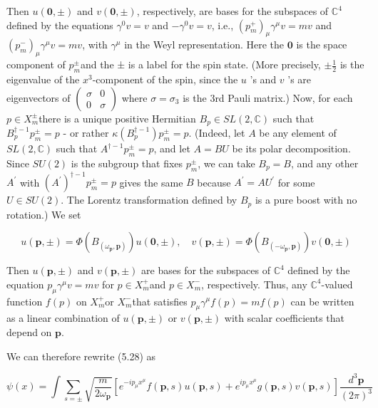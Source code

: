 \documentclass[10pt, letterpaper]{article}
\begin{document}
Then $u(\mathbf{0}, \pm)$ and $v(\mathbf{0}, \pm)$, respectively, are bases for the subspaces of $\mathbb{C}^{4}$ defined by the equations $\gamma^{0} v=v$ and $-\gamma^{0} v=v$, i.e., $\left(p_{m}^{+}\right)_{\mu} \gamma^{\mu} v=m v$ and $\left(p_{m}^{-}\right)_{\mu} \gamma^{\mu} v=m v$, with $\gamma^{\mu}$ in the Weyl representation. Here the $\mathbf{0}$ is the space component of $p_{m}^{ \pm}$and the ± is a label for the spin state. (More precisely, $\pm \frac{1}{2}$ is the eigenvalue of the $x^{3}$-component of the spin, since the $u$ 's and $v$ 's are eigenvectors of $\left(\begin{array}{cc}\sigma & 0 \\ 0 & \sigma\end{array}\right)$ where $\sigma=\sigma_{3}$ is the 3rd Pauli matrix.) Now, for each $p \in X_{m}^{ \pm}$there is a unique positive Hermitian $B_{p} \in S L(2, \mathbb{C})$ such that $B_{p}^{\dagger-1} p_{m}^{ \pm}=p$ - or rather $\kappa\left(B_{p}^{\dagger-1}\right) p_{m}^{ \pm}=p$. (Indeed, let $A$ be any element of $S L(2, \mathbb{C})$ such that $A^{\dagger-1} p_{m}^{ \pm}=p$, and let $A=B U$ be its polar decomposition. Since $S U(2)$ is the subgroup that fixes $p_{m}^{ \pm}$, we can take $B_{p}=B$, and any other $A^{\prime}$ with $\left(A^{\prime}\right)^{\dagger-1} p_{m}^{ \pm}=p$ gives the same $B$ because $A^{\prime}=A U^{\prime}$ for some $U \in S U(2)$. The Lorentz transformation defined by $B_{p}$ is a pure boost with no rotation.) We set

$$
u(\mathbf{p}, \pm)=\Phi\left(B_{\left(\omega_{\mathbf{p}}, \mathbf{p}\right)}\right) u(\mathbf{0}, \pm), \quad v(\mathbf{p}, \pm)=\Phi\left(B_{\left(-\omega_{\mathbf{p}}, \mathbf{p}\right)}\right) v(\mathbf{0}, \pm)
$$

Then $u(\mathbf{p}, \pm)$ and $v(\mathbf{p}, \pm)$ are bases for the subspaces of $\mathbb{C}^{4}$ defined by the equation $p_{\mu} \gamma^{\mu} v=m v$ for $p \in X_{m}^{+}$and $p \in X_{m}^{-}$, respectively. Thus, any $\mathbb{C}^{4}$-valued function $f(p)$ on $X_{m}^{+}$or $X_{m}^{-}$that satisfies $p_{\mu} \gamma^{\mu} f(p)=m f(p)$ can be written as a linear combination of $u(\mathbf{p}, \pm)$ or $v(\mathbf{p}, \pm)$ with scalar coefficients that depend on $\mathbf{p}$.

We can therefore rewrite (5.28) as

$$
\psi(x)=\int \sum_{s= \pm} \sqrt{\frac{m}{2 \omega_{\mathbf{p}}}}\left[e^{-i p_{\mu} x^{\mu}} f(\mathbf{p}, s) u(\mathbf{p}, s)+e^{i p_{\mu} x^{\mu}} g(\mathbf{p}, s) v(\mathbf{p}, s)\right] \frac{d^{3} \mathbf{p}}{(2 \pi)^{3}}
$$
\end{document}
